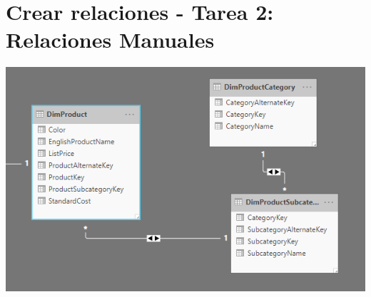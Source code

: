 \section{Crear relaciones - Tarea 2: Relaciones Manuales} 

\begin{center}
\includegraphics[width=20cm]{./Imagenes/CapturaNro02}
\end{center}